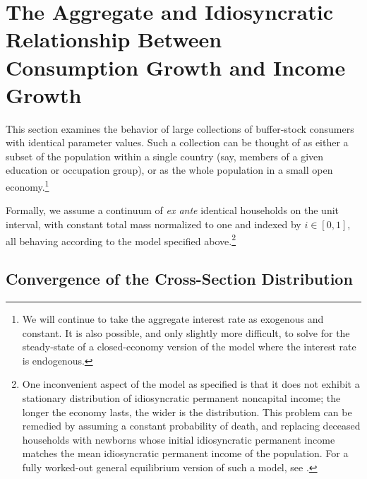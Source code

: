 \documentclass[titlepage]{\econtex}\providecommand{\texname}{BufferStockTheory}%
\begin{document}
\begin{comment}
The software archive associated with this paper presents an example in
which this perverse effect dominates.  However, extreme assumptions
were required ($\pZero < 0.000000001$, a very small probability of the
zero-income shock) and the region in which
$\pmb{\Upsilon}_{t+1}^{\prime} > 0$ was tiny.  In practice, for
plausible parametric choices,
$\Ex_{t}[\pmb{\Upsilon}_{t+1}^{\prime}]<0$ should generally hold.
\end{comment}



\section{The Aggregate and Idiosyncratic Relationship Between
Consumption Growth and Income Growth}

This section examines the behavior of large collections of buffer-stock consumers with identical parameter values. Such a collection can be thought of as either a subset of the population within a single country (say, members of a given education or occupation group), or as the whole population in a small open economy.\footnote{We will continue to take the aggregate interest rate as exogenous and constant. It is also possible, and only slightly more difficult, to solve for the steady-state of a closed-economy version of the model where the interest rate is endogenous.}

Formally, we assume a continuum of {\it ex ante} identical households
on the unit interval, with constant total mass normalized to one and
indexed by $i \in [0,1]$, all behaving according to the model
specified above.\footnote{One inconvenient aspect of the model as
  specified is that it does not exhibit a stationary distribution of
  idiosyncratic permanent noncapital income; the longer the economy lasts, the wider is the
  distribution.  This problem can be remedied by assuming a constant
  probability of death, and replacing deceased households with
  newborns whose initial idiosyncratic permanent income matches the
  mean idiosyncratic permanent income of the population.  For a fully
  worked-out general equilibrium version of such a model, see \cite{BSinKS}.}

\subsection{Convergence of the Cross-Section Distribution}
\end{document}
